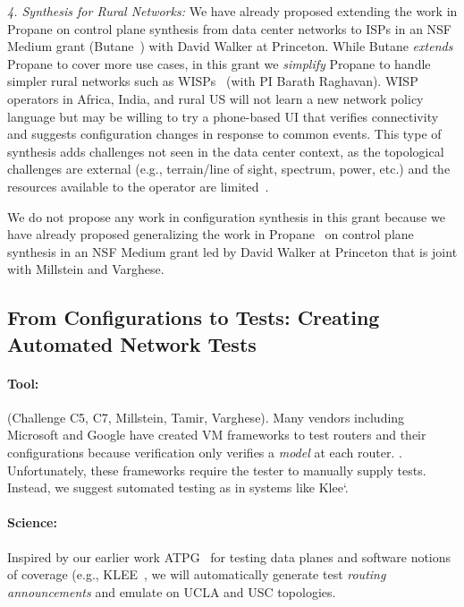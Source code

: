 {\em 4. Synthesis for Rural Networks:}  We have already proposed extending the work in Propane on control plane synthesis from data center networks to ISPs in an NSF Medium grant (Butane~\cite{butane}) with David Walker at Princeton.  While Butane {\em extends} Propane to cover more use cases, in this grant we {\em simplify} Propane to handle simpler rural networks such as WISPs~\cite{barathwisp} (with PI Barath Raghavan). WISP operators in Africa, India, and rural US will not learn a new network policy language but may be willing to try a phone-based UI that verifies connectivity and suggests configuration changes in response to common events. This type of synthesis adds challenges not seen in the data center context, as the topological challenges are external (e.g., terrain/line of sight, spectrum, power, etc.) and the resources available to the operator are limited~\cite{zyxt18}.

We do not propose any work in configuration synthesis in this grant because we have already proposed generalizing the work in Propane~\cite{propane} on control plane synthesis in an NSF Medium grant led by David Walker at Princeton that is joint with Millstein and Varghese. 

\subsection{From Configurations to Tests: Creating Automated Network Tests}

\paragraph*{Tool:} (Challenge C5, C7, Millstein, Tamir, Varghese). Many vendors including Microsoft and 
Google have created VM frameworks to test routers and their configurations because verification only verifies a {\em  model} at  each router. .  Unfortunately, these frameworks require
the tester to manually supply tests.  Instead, we suggest sutomated testing as in systems like Klee`\cite{klee}.

\paragraph*{Science:}  Inspired  by our earlier work ATPG~\cite{atpg} for testing data planes and software notions of coverage (e.g., KLEE~\cite{klee}, we will automatically generate test {\em routing announcements} and emulate on UCLA and USC topologies.

